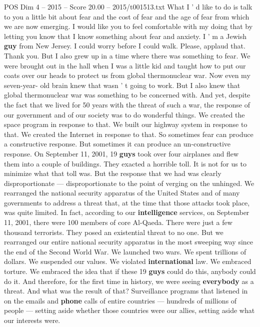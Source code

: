 \begin{textsample}{POS Dim 4 – 2015 – Score 20.00 – 2015/t001513.txt}  \label{ex:f4_pos_052}
What I ' d like to do is talk to you a little bit about fear and the cost of fear and the age of fear from which we are now emerging.
I would like you to feel comfortable with my doing that by letting you know that I know something about fear and anxiety.
I ' m a Jewish \textbf{guy} from New Jersey.
I could worry before I could walk.
Please, applaud that.
Thank you.
But I also grew up in a time where there was something to fear.
We were brought out in the hall when I was a little kid and taught how to put our coats over our heads to protect us from global thermonuclear war.
Now even my seven-year- old brain knew that wasn ' t going to work.
But I also knew that global thermonuclear war was something to be concerned with.
And yet, despite the fact that we lived for 50 years with the threat of such a war, the response of our government and of our society was to do wonderful things.
We created the space program in response to that.
We built our highway system in response to that.
We created the Internet in response to that.
So sometimes fear can produce a constructive response.
But sometimes it can produce an un-constructive response.
On September 11, 2001, 19 \textbf{guys} took over four airplanes and flew them into a couple of buildings.
They exacted a horrible toll.
It is not for us to minimize what that toll was.
But the response that we had was clearly disproportionate — disproportionate to the point of verging on the unhinged.
We rearranged the national security apparatus of the United States and of many governments to address a threat that, at the time that those attacks took place, was quite limited.
In fact, according to our \textbf{intelligence} services, on September 11, 2001, there were 100 members of core Al-Qaeda.
There were just a few thousand terrorists.
They posed an existential threat to no one.
But we rearranged our entire national security apparatus in the most sweeping way since the end of the Second World War.
We launched two wars.
We spent trillions of dollars.
We suspended our values.
We violated \textbf{international} law.
We embraced torture.
We embraced the idea that if these 19 \textbf{guys} could do this, anybody could do it.
And therefore, for the first time in history, we were seeing \textbf{everybody} as a threat.
And what was the result of that?
Surveillance programs that listened in on the emails and \textbf{phone} calls of entire countries — hundreds of millions of people — setting aside whether those countries were our allies, setting aside what our interests were.

\end{textsample}
